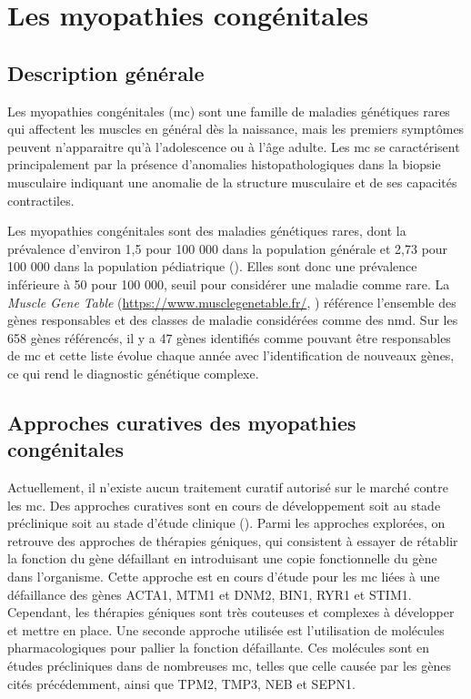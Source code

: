 \section{Les myopathies congénitales}
\subsection{Description générale}
Les myopathies congénitales (\gls{mc}) sont une famille de maladies génétiques rares qui affectent les muscles en général dès la naissance, mais les premiers symptômes peuvent n'apparaitre qu'à l'adolescence ou à l'âge adulte. Les \gls{mc} se caractérisent principalement par la présence d'anomalies histopathologiques dans la biopsie musculaire indiquant une anomalie de la structure musculaire et de ses capacités contractiles.

Les myopathies congénitales sont des maladies génétiques rares, dont la prévalence d'environ 1,5 pour 100 000 dans la population générale et 2,73 pour 100 000 dans la population pédiatrique (\cite{huang_systematic_2021}). Elles sont donc une prévalence inférieure à 50 pour 100 000, seuil pour considérer une maladie comme rare. La \textit{Muscle Gene Table} (\url{https://www.musclegenetable.fr/}, \cite{benarroch_2023_2023}) référence l'ensemble des gènes responsables et des classes de maladie considérées comme des \gls{nmd}. Sur les 658 gènes référencés, il y a 47 gènes identifiés comme pouvant être responsables de \gls{mc} et cette liste évolue chaque année avec l'identification de nouveaux gènes, ce qui rend le diagnostic génétique complexe. 

\subsection{Approches curatives des myopathies congénitales}
Actuellement, il n'existe aucun traitement curatif autorisé sur le marché contre les \gls{mc}. Des approches curatives sont en cours de développement soit au stade préclinique soit au stade d'étude clinique (\cite{gineste_therapeutic_2023, guan_gene_2016}). Parmi les approches explorées, on retrouve des approches de thérapies géniques, qui consistent à essayer de rétablir la fonction du gène défaillant en introduisant une copie fonctionnelle du gène dans l'organisme. Cette approche est en cours d'étude pour les \gls{mc} liées à une défaillance des gènes ACTA1, MTM1 et DNM2, BIN1, RYR1 et STIM1. Cependant, les thérapies géniques sont très couteuses et complexes à développer et mettre en place. Une seconde approche utilisée est l'utilisation de molécules pharmacologiques pour pallier la fonction défaillante. Ces molécules sont en études précliniques dans de nombreuses \gls{mc}, telles que celle causée par les gènes cités précédemment, ainsi que TPM2, TMP3, NEB et SEPN1. 

